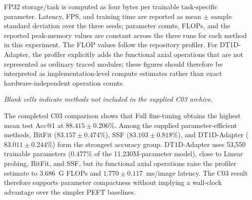 \documentclass[pdflatex,sn-mathphys-num]{sn-jnl}
\theoremstyle{thmstyleone}
\theoremstyle{thmstyletwo}
\theoremstyle{thmstylethree}
\begin{document}
\begin{table}[!t]
\vspace{2pt}
\parbox{\textwidth}{\scriptsize
FP32 storage/task is computed as four bytes per trainable task-specific parameter.
Latency, FPS, and training time are reported as mean $\pm$ sample standard deviation over the three seeds; parameter counts, FLOPs, and the reported peak-memory values are constant across the three runs for each method in this experiment.
The FLOP values follow the repository profiler. For DT1D-Adapter, the profiler explicitly adds the functional axial operations that are not represented as ordinary traced modules; these figures should therefore be interpreted as implementation-level compute estimates rather than exact hardware-independent operation counts.
}

\vspace{2pt}
{\footnotesize\textit{Blank cells indicate methods not included in the supplied C03 archive.}}
\end{table}

The completed C03 comparison shows that Full fine-tuning obtains the highest mean test Acc@1 at $88.415\pm0.206\%$. Among the supplied parameter-efficient methods, BitFit ($83.157\pm0.474\%$), SSF ($83.103\pm0.818\%$), and DT1D-Adapter ($83.011\pm0.244\%$) form the strongest accuracy group. DT1D-Adapter uses 53,550 trainable parameters (0.477\% of the 11.230M-parameter model), close to Linear probing, BitFit, and SSF, but its functional axial operations raise the profiler estimate to 3.686~G FLOPs and $1.770\pm0.117$~ms/image latency. The C03 result therefore supports parameter compactness without implying a wall-clock advantage over the simpler PEFT baselines.


\end{document}
